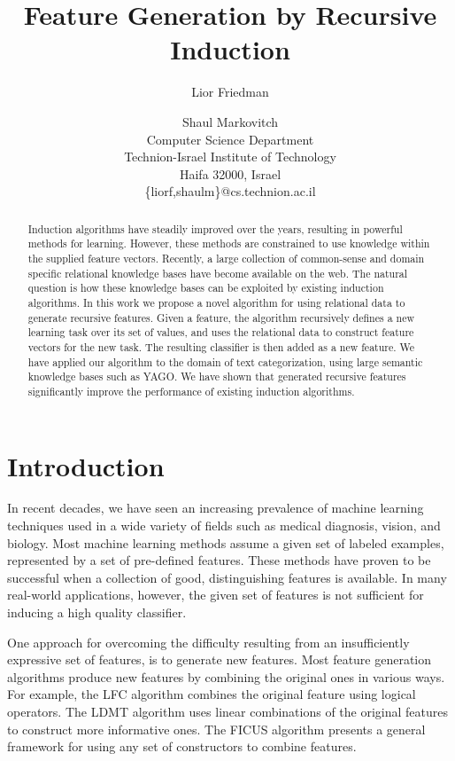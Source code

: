 \documentclass{article}
\title{Feature Generation by Recursive Induction}
\author{Lior Friedman \and Shaul Markovitch\\
	Computer Science Department \\
	Technion-Israel Institute of Technology\\
	Haifa 32000, Israel\\
	\{liorf,shaulm\}@cs.technion.ac.il}
\theoremstyle{definition}
\begin{document}
\maketitle

\begin{abstract}
  Induction algorithms have steadily improved over the years, resulting in powerful methods for learning. However, these methods are constrained to use knowledge within the supplied feature vectors. Recently, a large collection of common-sense and domain specific relational knowledge bases have become available on the web. The natural question is how these knowledge bases can be exploited by existing induction algorithms.
  In this work we propose a novel algorithm for using relational data to generate recursive features. Given a feature, the algorithm recursively defines a new learning task over its set of values, and uses the relational data to construct feature vectors for the new task. The resulting classifier is then added as a new feature.
  We have applied our algorithm to the domain of text categorization, using large semantic knowledge bases such as YAGO. We have shown that generated recursive features significantly improve the performance of existing induction algorithms.
\end{abstract}

\section{Introduction}
\label{sec:Intro}
In recent decades, we have seen an increasing prevalence of machine learning techniques used in a wide variety of fields such as medical diagnosis, vision, and biology.
Most machine learning methods assume a given set of labeled examples, represented by a set of
pre-defined features. These methods have proven to be successful when a collection of good,
distinguishing features is available.
In many real-world applications, however, the given set of features is not sufficient for inducing a high quality classifier.

One approach for overcoming the difficulty resulting from an insufficiently expressive set of features, is to generate new features.  Most feature generation algorithms produce new features by combining the original ones in various ways.  For example, the LFC algorithm \citep{ragavan1993complex} combines the original feature using logical operators.  The LDMT algorithm \citep{utgo1991linear} uses linear combinations of the original features to construct more informative ones.  The FICUS algorithm \citep{markovitch2002feature} presents a general framework for using any set of constructors to combine features.
\end{document}
